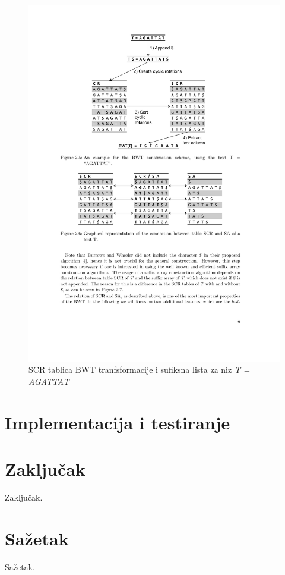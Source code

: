 \documentclass[times, utf8, seminar, numeric]{fer}
\begin{document}
\begin{figure}[!htb]
\centering
\includegraphics{fig/bwt_sa.pdf}
\caption{SCR tablica BWT tranfsformacije i sufiksna lista za niz \textit{T = AGATTAT}}
\label{fig:bwt_sa}
\end{figure}


\chapter{Implementacija i testiranje}

\chapter{Zaključak}
Zaključak.




\chapter{Sažetak}
Sažetak.
\end{document}
